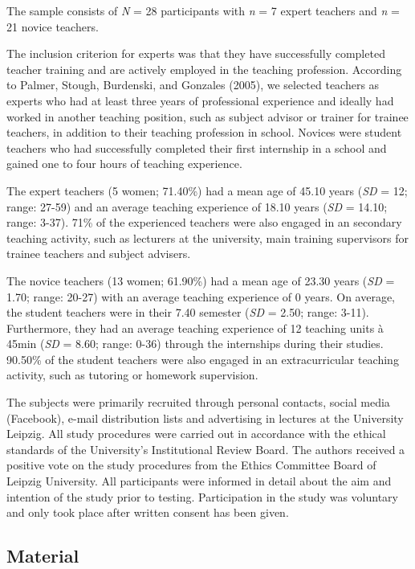 \documentclass[
  man,floatsintext]{apa6}
\begin{document}
The sample consists of \emph{N} = 28 participants with \emph{n} = 7 expert teachers and \emph{n} = 21 novice teachers.

The inclusion criterion for experts was that they have successfully completed teacher training and are actively employed in the teaching profession. According to Palmer, Stough, Burdenski, and Gonzales (2005), we selected teachers as experts who had at least three years of professional experience and ideally had worked in another teaching position, such as subject advisor or trainer for trainee teachers, in addition to their teaching profession in school. Novices were student teachers who had successfully completed their first internship in a school and gained one to four hours of teaching experience.

The expert teachers (5 women; 71.40\%) had a mean age of 45.10 years (\emph{SD} = 12; range: 27-59) and an average teaching experience of 18.10 years (\emph{SD} = 14.10; range: 3-37). 71\% of the experienced teachers were also engaged in an secondary teaching activity, such as lecturers at the university, main training supervisors for trainee teachers and subject advisers.

The novice teachers (13 women; 61.90\%) had a mean age of 23.30 years (\emph{SD} = 1.70; range: 20-27) with an average teaching experience of 0 years. On average, the student teachers were in their 7.40 semester (\emph{SD} = 2.50; range: 3-11). Furthermore, they had an average teaching experience of 12 teaching units à 45min (\emph{SD} = 8.60; range: 0-36) through the internships during their studies. 90.50\% of the student teachers were also engaged in an extracurricular teaching activity, such as tutoring or homework supervision.

The subjects were primarily recruited through personal contacts, social media (Facebook), e-mail distribution lists and advertising in lectures at the University Leipzig. All study procedures were carried out in accordance with the ethical standards of the University's Institutional Review Board. The authors received a positive vote on the study procedures from the Ethics Committee Board of Leipzig University. All participants were informed in detail about the aim and intention of the study prior to testing. Participation in the study was voluntary and only took place after written consent has been given.

\hypertarget{material}{%
\subsection{Material}\label{material}}
\end{document}
